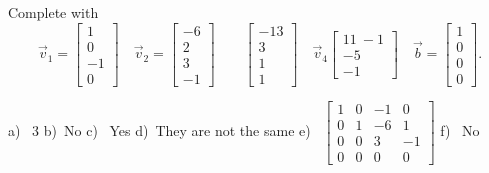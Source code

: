 \begin{exercise}
Complete  with
\begin{equation*}
\vec{v}_1 = \begin{bmatrix} 1 \\ 0 \\ -1 \\ 0 \end{bmatrix} \quad \vec{v}_2 = \begin{bmatrix} -6 \\ 2 \\ 3 \\ -1 \end{bmatrix} \qquad \begin{bmatrix} -13 \\ 3 \\ 1 \\ 1 \end{bmatrix} \quad \vec{v}_4 \begin{bmatrix} 11 \ -1 \\ -5 \\ -1 \end{bmatrix} \quad \vec{b} = \begin{bmatrix} 1 \\ 0 \\ 0 \\ 0 \end{bmatrix}. 
\end{equation*}
\end{exercise}
\comboSol{%
}
{%
a)~ 3 \quad b)~No \quad c)~ Yes \quad d)~They are not the same \quad
e)~ $\left[\begin{smallmatrix} 1 & 0 & -1 & 0 \\ 0 & 1 & -6 & 1 \\ 0 & 0 & 3 & -1 \\ 0 & 0 & 0 & 0 \end{smallmatrix}\right]$ \quad f)~ No
}

\setcounter{exercise}{100}

